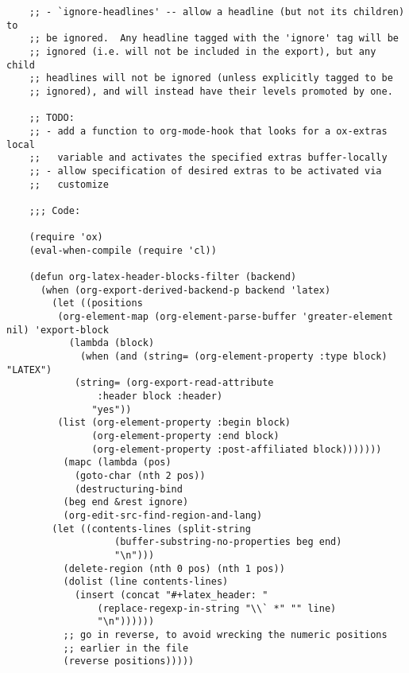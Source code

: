 \documentclass[11pt]{article}
\begin{document}
\begin{verbatim}
    ;; - `ignore-headlines' -- allow a headline (but not its children) to
    ;; be ignored.  Any headline tagged with the 'ignore' tag will be
    ;; ignored (i.e. will not be included in the export), but any child
    ;; headlines will not be ignored (unless explicitly tagged to be
    ;; ignored), and will instead have their levels promoted by one.

    ;; TODO:
    ;; - add a function to org-mode-hook that looks for a ox-extras local
    ;;   variable and activates the specified extras buffer-locally
    ;; - allow specification of desired extras to be activated via
    ;;   customize

    ;;; Code:

    (require 'ox)
    (eval-when-compile (require 'cl))

    (defun org-latex-header-blocks-filter (backend)
      (when (org-export-derived-backend-p backend 'latex)
        (let ((positions
         (org-element-map (org-element-parse-buffer 'greater-element nil) 'export-block
           (lambda (block)
             (when (and (string= (org-element-property :type block) "LATEX")
            (string= (org-export-read-attribute
                :header block :header)
               "yes"))
         (list (org-element-property :begin block)
               (org-element-property :end block)
               (org-element-property :post-affiliated block)))))))
          (mapc (lambda (pos)
            (goto-char (nth 2 pos))
            (destructuring-bind
          (beg end &rest ignore)
          (org-edit-src-find-region-and-lang)
        (let ((contents-lines (split-string
                   (buffer-substring-no-properties beg end)
                   "\n")))
          (delete-region (nth 0 pos) (nth 1 pos))
          (dolist (line contents-lines)
            (insert (concat "#+latex_header: "
                (replace-regexp-in-string "\\` *" "" line)
                "\n"))))))
          ;; go in reverse, to avoid wrecking the numeric positions
          ;; earlier in the file
          (reverse positions)))))



\end{verbatim}
\end{document}
